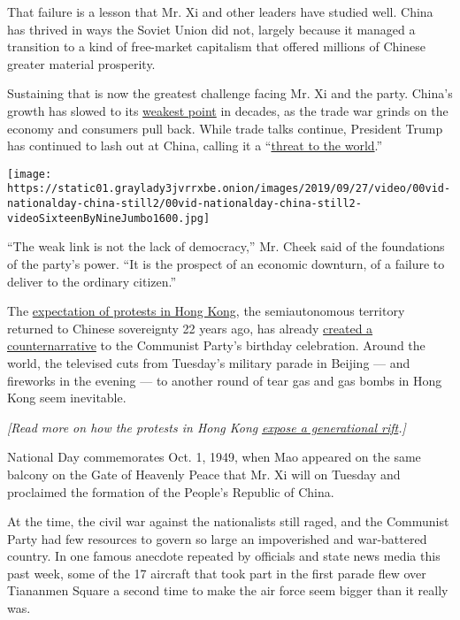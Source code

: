 That failure is a lesson that Mr. Xi and other leaders have studied
well. China has thrived in ways the Soviet Union did not, largely
because it managed a transition to a kind of free-market capitalism that
offered millions of Chinese greater material prosperity.

Sustaining that is now the greatest challenge facing Mr. Xi and the
party. China's growth has slowed to its
\href{https://www.nytimes3xbfgragh.onion/2019/07/14/business/china-economy-growth-gdp-trade-war.html}{weakest
point} in decades, as the trade war grinds on the economy and consumers
pull back. While trade talks continue, President Trump has continued to
lash out at China, calling it a
``\href{https://www.nytimes3xbfgragh.onion/2019/09/20/us/politics/trump-china-theat-to-world.html}{threat
to the world}.''

\texttt{[image: https://static01.graylady3jvrrxbe.onion/images/2019/09/27/video/00vid-nationalday-china-still2/00vid-nationalday-china-still2-videoSixteenByNineJumbo1600.jpg]}

``The weak link is not the lack of democracy,'' Mr. Cheek said of the
foundations of the party's power. ``It is the prospect of an economic
downturn, of a failure to deliver to the ordinary citizen.''

The
\href{https://www.nytimes3xbfgragh.onion/2019/09/28/world/asia/hong-kong-protest.html}{expectation
of protests in Hong Kong}, the semiautonomous territory returned to
Chinese sovereignty 22 years ago, has already
\href{https://www.nytimes3xbfgragh.onion/2019/09/29/business/hong-kong-china-power.html}{created
a counternarrative} to the Communist Party's birthday celebration.
Around the world, the televised cuts from Tuesday's military parade in
Beijing --- and fireworks in the evening --- to another round of tear
gas and gas bombs in Hong Kong seem inevitable.

\emph{{[}Read more on how the protests in Hong Kong}
\emph{\href{https://www.nytimes3xbfgragh.onion/2019/09/28/world/asia/hong-kong-protests-china.html?action=click\&module=inline\&pgtype=Article}{expose
a generational rift}.{]}}

National Day commemorates Oct. 1, 1949, when Mao appeared on the same
balcony on the Gate of Heavenly Peace that Mr. Xi will on Tuesday and
proclaimed the formation of the People's Republic of China.

At the time, the civil war against the nationalists still raged, and the
Communist Party had few resources to govern so large an impoverished and
war-battered country. In one famous anecdote repeated by officials and
state news media this past week, some of the 17 aircraft that took part
in the first parade flew over Tiananmen Square a second time to make the
air force seem bigger than it really was.

